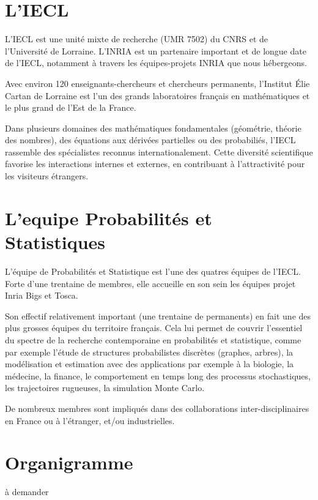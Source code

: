 \documentclass[stage2a]{tnreport}
\begin{document}
\section{L'IECL}
L’IECL est une unité mixte de recherche (UMR 7502) du CNRS et de l’Université de Lorraine. L’INRIA est un partenaire important et de longue date de l’IECL, notamment à travers les équipes-projets INRIA que nous hébergeons.

Avec environ 120 enseignants-chercheurs et chercheurs permanents, l’Institut Élie Cartan de Lorraine est l’un des grands laboratoires français en mathématiques et le plus grand de l’Est de la France.

 Dans plusieurs domaines des mathématiques fondamentales (géométrie, théorie des nombres), des équations aux dérivées partielles ou des probabiliés, l’IECL rassemble des spécialistes reconnus internationalement. Cette diversité scientifique favorise les interactions internes et externes, en contribuant à l’attractivité pour les visiteurs étrangers.

\newpage

\section{L'equipe Probabilités et Statistiques}

L’équipe de Probabilités et Statistique est l’une des quatres équipes de l’IECL. Forte d’une trentaine de membres, elle accueille en son sein les équipes projet Inria Bigs et Tosca.

Son effectif relativement important (une trentaine de permanents) en fait une des plus grosses équipes du territoire français. Cela lui permet de couvrir l’essentiel du spectre de la recherche contemporaine en probabilités et statistique, comme par exemple l’étude de structures probabilistes discrètes (graphes, arbres), la modélisation et estimation avec des applications par exemple à la biologie, la médecine, la finance, le comportement en temps long des processus stochastiques, les trajectoires rugueuses, la simulation Monte Carlo.

De nombreux membres sont impliqués dans des collaborations inter-disciplinaires en France ou à l’étranger, et/ou industrielles.

\section{Organigramme}

à demander
\end{document}
